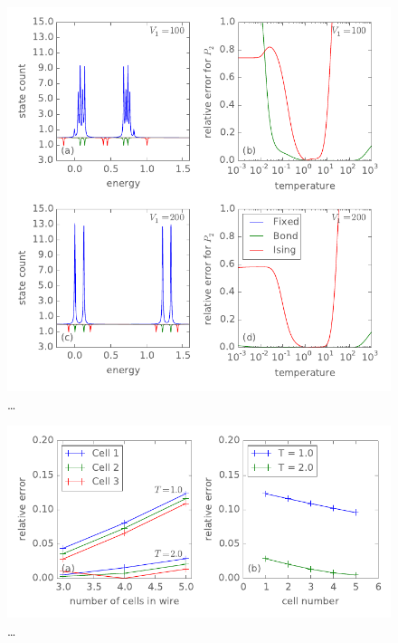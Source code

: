 \begin{figure}
  \center
  \includegraphics{ising_approximation2}
  \caption{\ldots}
  \label{fig:ising_approximation2}
\end{figure}
%
%
\begin{figure}
  \center
  \includegraphics{ising_approximation3}
  \caption{\ldots}
  \label{fig:ising_approximation3}
\end{figure}
%







